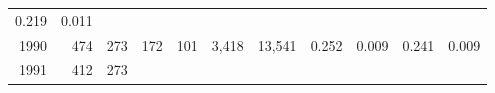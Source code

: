 \documentclass[]{article}
\begin{document}
\begin{longtable}[]{@{}rrrrrrrrrrr@{}}
\begin{minipage}[t]{0.10\columnwidth}
0.219\strut
\end{minipage} & \begin{minipage}[t]{0.04\columnwidth}\raggedleft\strut
0.011\strut
\end{minipage}\tabularnewline
\begin{minipage}[t]{0.06\columnwidth}\raggedleft\strut
1990\strut
\end{minipage} & \begin{minipage}[t]{0.07\columnwidth}\raggedleft\strut
474\strut
\end{minipage} & \begin{minipage}[t]{0.07\columnwidth}\raggedleft\strut
273\strut
\end{minipage} & \begin{minipage}[t]{0.07\columnwidth}\raggedleft\strut
172\strut
\end{minipage} & \begin{minipage}[t]{0.07\columnwidth}\raggedleft\strut
101\strut
\end{minipage} & \begin{minipage}[t]{0.07\columnwidth}\raggedleft\strut
3,418\strut
\end{minipage} & \begin{minipage}[t]{0.05\columnwidth}\raggedleft\strut
13,541\strut
\end{minipage} & \begin{minipage}[t]{0.09\columnwidth}\raggedleft\strut
0.252\strut
\end{minipage} & \begin{minipage}[t]{0.05\columnwidth}\raggedleft\strut
0.009\strut
\end{minipage} & \begin{minipage}[t]{0.10\columnwidth}\raggedleft\strut
0.241\strut
\end{minipage} & \begin{minipage}[t]{0.04\columnwidth}\raggedleft\strut
0.009\strut
\end{minipage}\tabularnewline
\begin{minipage}[t]{0.06\columnwidth}\raggedleft\strut
1991\strut
\end{minipage} & \begin{minipage}[t]{0.07\columnwidth}\raggedleft\strut
412\strut
\end{minipage} & \begin{minipage}[t]{0.07\columnwidth}\raggedleft\strut
273\strut
\end{minipage} & \begin{minipage}[t]{0.07\columnwidth}\raggedleft\strut

\end{minipage}
\end{longtable}
\end{document}
